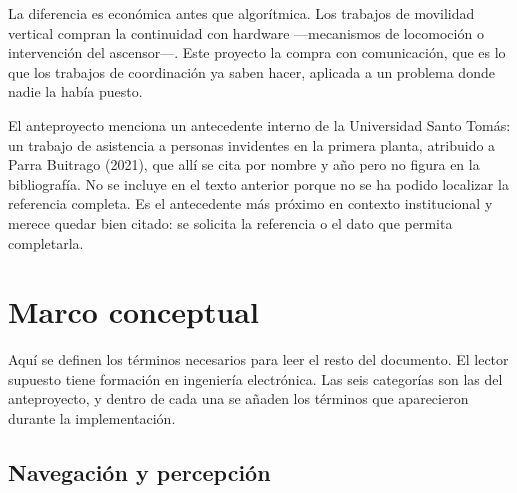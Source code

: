La diferencia es económica antes que algorítmica. Los trabajos de movilidad
vertical compran la continuidad con hardware —mecanismos de locomoción o
intervención del ascensor—. Este proyecto la compra con comunicación, que es lo
que los trabajos de coordinación ya saben hacer, aplicada a un problema donde
nadie la había puesto.

\begin{notarevisor}
El anteproyecto menciona un antecedente interno de la Universidad Santo Tomás:
un trabajo de asistencia a personas invidentes en la primera planta, atribuido a
Parra Buitrago (2021), que allí se cita por nombre y año pero no figura en la
bibliografía. No se incluye en el texto anterior porque no se ha podido
localizar la referencia completa. Es el antecedente más próximo en contexto
institucional y merece quedar bien citado: se solicita la referencia o el dato
que permita completarla.
\end{notarevisor}

\section{Marco conceptual}
%
%

Aquí se definen los términos necesarios para leer el resto del documento. El
lector supuesto tiene formación en ingeniería electrónica. Las seis categorías
son las del anteproyecto, y dentro de cada una se añaden los términos que
aparecieron durante la implementación.

\subsection{Navegación y percepción}


